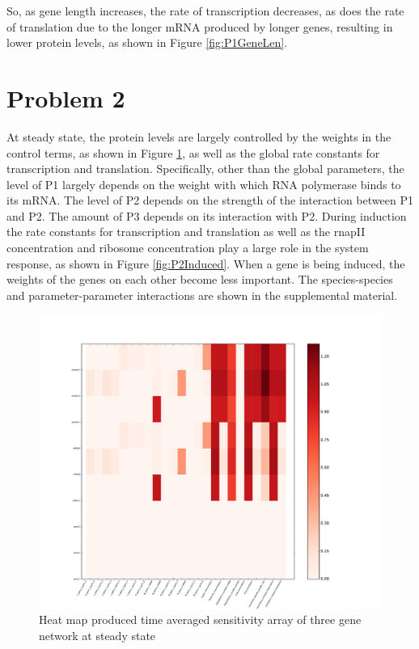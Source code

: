\documentclass{article}
\begin{document}
So, as gene length increases, the rate of transcription decreases, as does the rate of translation due to the longer mRNA produced by longer genes, resulting in lower protein levels, as shown in Figure \ref{fig:P1GeneLen}. 
\newpage 
\section*{Problem 2}
At steady state, the protein levels are largely controlled by the weights in the control terms, as shown in Figure \ref{fig:P2SS}, as well as the global rate constants for transcription and translation. Specifically, other than the global parameters, the level of P1 largely depends on the weight with which RNA polymerase binds to its mRNA. The level of P2 depends on the strength of the interaction between P1 and P2. The amount of P3 depends on its interaction with P2. During induction the rate constants for transcription and translation as well as the rnapII concentration and ribosome concentration play a large role in the system response, as shown in Figure \ref{fig:P2Induced}. When a gene is being induced, the weights of the genes on each other become less important. The species-species and parameter-parameter interactions are shown in the supplemental material.

\begin{figure}[h]
\includegraphics[width=12cm]{../ThreeGeneRachelV2/figures/ParameterSpeciesInteractionsFrom0to10}
\caption{Heat map produced time averaged sensitivity array of three gene network at steady state}
\label{fig:P2SS}
\end{figure}
\end{document}
